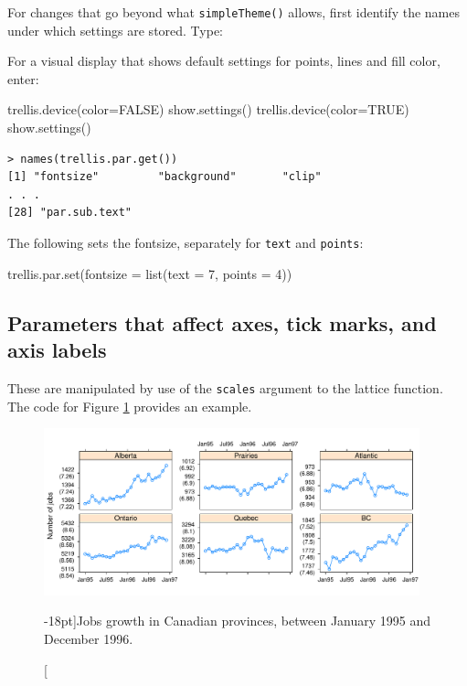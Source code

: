 \documentclass{tufte-book}\usepackage[]{graphicx}\usepackage[]{color}
\newcommand{\txtt}[1]{\texttt{#1}}
\begin{document}
For changes that go beyond what \txtt{simpleTheme()} allows, first
identify the names under which settings are stored. Type:
\begin{marginfigure}
For a visual display that shows default settings for
  points, lines and fill color, enter:
\begin{Schunk}
\begin{Sinput}
trellis.device(color=FALSE)
show.settings()
trellis.device(color=TRUE)
show.settings()
\end{Sinput}
\end{Schunk}
\end{marginfigure}
\begin{verbatim}
> names(trellis.par.get())
[1] "fontsize"         "background"       "clip"
. . .
[28] "par.sub.text"
\end{verbatim}

The following sets the fontsize, separately for \txtt{text} and
\txtt{points}:\\[-6pt]

\noindent
\begin{minipage}[t]{1.175\textwidth}
\begin{Schunk}
\begin{Sinput}
trellis.par.set(fontsize = list(text = 7,
                                points = 4))
\end{Sinput}
\end{Schunk}
\end{minipage}

\subsection*{Parameters that affect axes, tick marks, and axis labels}
\label{ss:lattice-axis}

These are manipulated by use of the \txtt{scales} argument to
the lattice function. The code for Figure \ref{fig:jobsplot}
provides an example.
\begin{figure}[h]
\begin{Schunk}


\centerline{\includegraphics[width=0.97\textwidth]{figs/09-jobsplot-1} }

\end{Schunk}
\caption[][-18pt]{Jobs growth in Canadian provinces, between January 1995
  and December 1996.}\label{fig:jobsplot}
\vspace*{18pt}
\end{figure}
\end{document}
